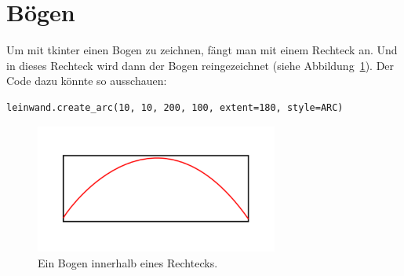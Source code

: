 \section{Bögen}

Um mit tkinter einen Bogen zu zeichnen, fängt man mit einem Rechteck an. Und in dieses Rechteck wird dann der Bogen reingezeichnet (siehe Abbildung~\ref{fig36}). Der Code dazu könnte so ausschauen:

\begin{Verbatim}[frame=single]
leinwand.create_arc(10, 10, 200, 100, extent=180, style=ARC)
\end{Verbatim}

\begin{figure}
\begin{center}
\includegraphics[width=80mm]{images/figure36}
\end{center}
\caption{Ein Bogen innerhalb eines Rechtecks.}\label{fig36}
\end{figure}

